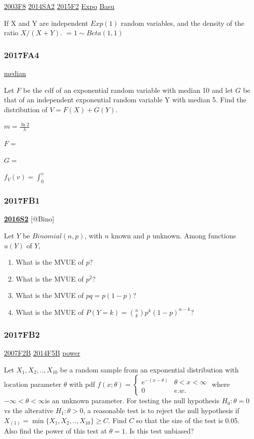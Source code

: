 \documentclass[10pt,twocolumn,portrait]{article}
\begin{document}
\protect\hyperlink{f8-1}{2003F8} \protect\hyperlink{sa2-2}{2014SA2}
\protect\hyperlink{f2-5}{2015F2} \protect\hyperlink{Expo}{Expo}
\protect\hyperlink{Basu}{Basu}

If X and Y are independent \(Exp(1)\) random variables, and the density
of the ratio \(X/(X+Y)\). \(=1\sim Beta(1,1)\)

\hypertarget{fa4-3}{%
\subsubsection{2017FA4}\label{fa4-3}}

\protect\hyperlink{median}{median}

Let \(F\) be the cdf of an exponential random variable with median 10
and let \(G\) be that of an independent exponential random variable Y
with median 5. Find the distribution of \(V=F(X)+G(Y)\).

\(m=\frac{\ln2}{\lambda}\)

\(F=\)

\(G=\)

\(f_V(v)=\int_0^v\)

\hypertarget{fb1-3}{%
\subsubsection{2017FB1}\label{fb1-3}}

\textbf{\protect\hyperlink{s2-4}{2016S2}} {[}@Bino{]}

Let \(Y\) be \(Binomial(n,p)\), with \(n\) known and \(p\) unknown.
Among functions \(u(Y)\) of \(Y\),

\begin{enumerate}
\def\labelenumi{(\alph{enumi})}
\item
  What is the MVUE of \(p\)?
\item
  What is the MVUE of \(p^2\)?
\item
  What is the MVUE of \(pq=p(1-p)\)?
\item
  What is the MVUE of \(P(Y=k)=\binom{n}{k}p^k(1-p)^{n-k}\)?
\end{enumerate}

\hypertarget{fb2-3}{%
\subsubsection{2017FB2}\label{fb2-3}}

\protect\hyperlink{f2b}{2007F2B} \protect\hyperlink{f5b-1}{2014F5B}
\protect\hyperlink{power}{power}

Let \(X_1,X_2,..,X_{10}\) be a random sample from an exponential
distribution with location parameter \(\theta\) with pdf
\(f(x;\theta)=\begin{cases}e^{-(x-\theta)}& \theta<x<\infty\\0& e.w.\end{cases}\)
where \(-\infty<\theta<\infty\)is an unknown parameter. For testing the
null hypothesis \(H_0:\theta=0\) vs the alterative \(H_1:\theta>0\), a
reasonable test is to reject the null hypothesis if
\(X_{(1)}=\min\{X_1,X_2,..,X_{10}\}\ge C\). Find \(C\) so that the size
of the test is 0.05. Also find the power of this test at \(\theta=1\).
Is this test unbiased?
\end{document}
